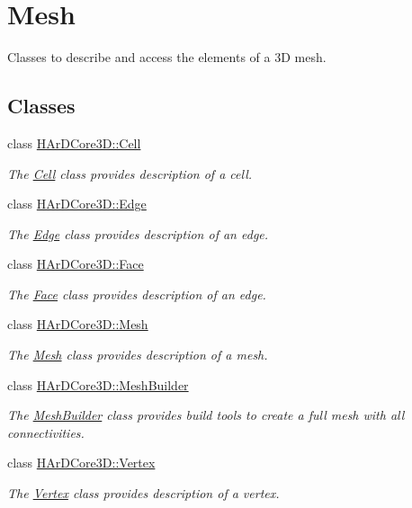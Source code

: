 \hypertarget{group__Mesh}{}\section{Mesh}
\label{group__Mesh}


Classes to describe and access the elements of a 3D mesh.  


\subsection*{Classes}
\begin{DoxyCompactItemize}
\item 
class \hyperlink{classHArDCore3D_1_1Cell}{H\+Ar\+D\+Core3\+D\+::\+Cell}
\begin{DoxyCompactList}\small\item\em The \hyperlink{classHArDCore3D_1_1Cell}{Cell} class provides description of a cell. \end{DoxyCompactList}\item 
class \hyperlink{classHArDCore3D_1_1Edge}{H\+Ar\+D\+Core3\+D\+::\+Edge}
\begin{DoxyCompactList}\small\item\em The \hyperlink{classHArDCore3D_1_1Edge}{Edge} class provides description of an edge. \end{DoxyCompactList}\item 
class \hyperlink{classHArDCore3D_1_1Face}{H\+Ar\+D\+Core3\+D\+::\+Face}
\begin{DoxyCompactList}\small\item\em The \hyperlink{classHArDCore3D_1_1Face}{Face} class provides description of an edge. \end{DoxyCompactList}\item 
class \hyperlink{classHArDCore3D_1_1Mesh}{H\+Ar\+D\+Core3\+D\+::\+Mesh}
\begin{DoxyCompactList}\small\item\em The \hyperlink{classHArDCore3D_1_1Mesh}{Mesh} class provides description of a mesh. \end{DoxyCompactList}\item 
class \hyperlink{classHArDCore3D_1_1MeshBuilder}{H\+Ar\+D\+Core3\+D\+::\+Mesh\+Builder}
\begin{DoxyCompactList}\small\item\em The \hyperlink{classHArDCore3D_1_1MeshBuilder}{Mesh\+Builder} class provides build tools to create a full mesh with all connectivities. \end{DoxyCompactList}\item 
class \hyperlink{classHArDCore3D_1_1Vertex}{H\+Ar\+D\+Core3\+D\+::\+Vertex}
\begin{DoxyCompactList}\small\item\em The \hyperlink{classHArDCore3D_1_1Vertex}{Vertex} class provides description of a vertex. \end{DoxyCompactList}\end{DoxyCompactItemize}
